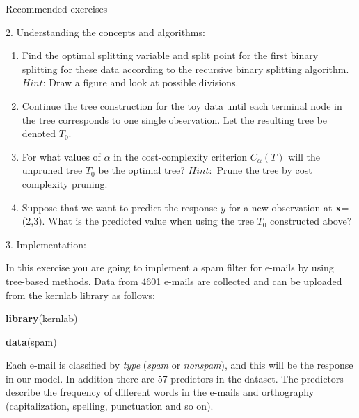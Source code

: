 \documentclass[10pt,ignorenonframetext,]{beamer}
\newenvironment{Shaded}{\begin{snugshade}}{\end{snugshade}}
\newcommand{\KeywordTok}[1]{\textcolor[rgb]{0.13,0.29,0.53}{\textbf{#1}}}
\newcommand{\NormalTok}[1]{#1}
\begin{document}
\begin{frame}[fragile]{Recommended exercises}
\begin{block}{2. Understanding the concepts and algorithms:}
\begin{enumerate}
\def\labelenumi{\alph{enumi})}
\setcounter{enumi}{2}
\item
  Find the optimal splitting variable and split point for the first
  binary splitting for these data according to the recursive binary
  splitting algorithm. \(Hint\): Draw a figure and look at possible
  divisions.
\item
  Continue the tree construction for the toy data until each terminal
  node in the tree corresponds to one single observation. Let the
  resulting tree be denoted \(T_0\).
\item
  For what values of \(\alpha\) in the cost-complexity criterion
  \(C_{\alpha}(T)\) will the unpruned tree \(T_0\) be the optimal tree?
  \(Hint:\) Prune the tree by cost complexity pruning.
\item
  Suppose that we want to predict the response \(y\) for a new
  observation at \textbf{x}=(2,3). What is the predicted value when
  using the tree \(T_0\) constructed above?
\end{enumerate}

\end{block}

\begin{block}{3. Implementation:}

In this exercise you are going to implement a spam filter for e-mails by
using tree-based methods. Data from 4601 e-mails are collected and can
be uploaded from the kernlab library as follows:

\begin{Shaded}
\begin{Highlighting}[]
\KeywordTok{library}\NormalTok{(kernlab)}

\KeywordTok{data}\NormalTok{(spam)}
\end{Highlighting}
\end{Shaded}

Each e-mail is classified by \emph{type} (\emph{spam} or
\emph{nonspam}), and this will be the response in our model. In addition
there are 57 predictors in the dataset. The predictors describe the
frequency of different words in the e-mails and orthography
(capitalization, spelling, punctuation and so on).


\end{block}
\end{frame}
\end{document}
